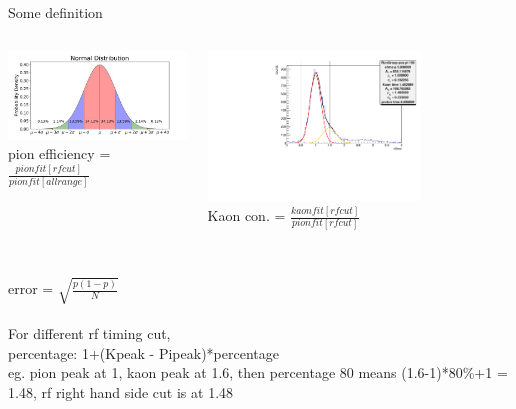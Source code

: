 \documentclass[aspectratio=169,xcolor=dvipsnames]{beamer}
\begin{document}
\begin{frame}{Some definition}
\begin{columns}
\begin{column}[T]{0.5\textwidth}
\includegraphics[width = \textwidth]{graphs/normal-distribution-curve.jpg}
\\pion efficiency = $\frac{pionfit[rfcut]}{pionfit[all range]}$

\end{column}
\begin{column}[T]{0.5\textwidth}
\includegraphics[width = 0.7\textwidth]{results/pid/rftime/rftime_pos_150_pi.pdf}
\\Kaon con. = $\frac{kaonfit[rfcut]}{pionfit[rfcut]}$
\end{column}
\end{columns}
\\error = $\sqrt{\frac{p(1-p)}{N}}$
\\
    \\For different rf timing cut,
    \\percentage: 1+(Kpeak - Pipeak)*percentage
  \\eg. pion peak at 1, kaon peak at 1.6, then percentage 80 means (1.6-1)*80\%+1 = 1.48, rf right hand side cut is at 1.48
\end{frame}
\end{document}
